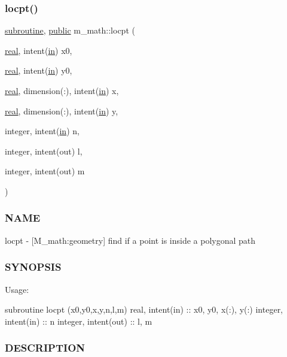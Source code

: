 \subsubsection{\texorpdfstring{locpt()}{locpt()}}
{\footnotesize\ttfamily \hyperlink{M__stopwatch_83_8txt_acfbcff50169d691ff02d4a123ed70482}{subroutine}, \hyperlink{M__stopwatch_83_8txt_a2f74811300c361e53b430611a7d1769f}{public} m\+\_\+math\+::locpt (\begin{DoxyParamCaption}\item[{\hyperlink{read__watch_83_8txt_abdb62bde002f38ef75f810d3a905a823}{real}, intent(\hyperlink{M__journal_83_8txt_afce72651d1eed785a2132bee863b2f38}{in})}]{x0,  }\item[{\hyperlink{read__watch_83_8txt_abdb62bde002f38ef75f810d3a905a823}{real}, intent(\hyperlink{M__journal_83_8txt_afce72651d1eed785a2132bee863b2f38}{in})}]{y0,  }\item[{\hyperlink{read__watch_83_8txt_abdb62bde002f38ef75f810d3a905a823}{real}, dimension(\+:), intent(\hyperlink{M__journal_83_8txt_afce72651d1eed785a2132bee863b2f38}{in})}]{x,  }\item[{\hyperlink{read__watch_83_8txt_abdb62bde002f38ef75f810d3a905a823}{real}, dimension(\+:), intent(\hyperlink{M__journal_83_8txt_afce72651d1eed785a2132bee863b2f38}{in})}]{y,  }\item[{integer, intent(\hyperlink{M__journal_83_8txt_afce72651d1eed785a2132bee863b2f38}{in})}]{n,  }\item[{integer, intent(out)}]{l,  }\item[{integer, intent(out)}]{m }\end{DoxyParamCaption})}



\subsubsection*{N\+A\+ME}

locpt -\/ \mbox{[}M\+\_\+math\+:geometry\mbox{]} find if a point is inside a polygonal path \subsubsection*{S\+Y\+N\+O\+P\+S\+IS}

Usage\+:

subroutine locpt (x0,y0,x,y,n,l,m) real, intent(in) \+:\+: x0, y0, x(\+:), y(\+:) integer, intent(in) \+:\+: n integer, intent(out) \+:\+: l, m

\subsubsection*{D\+E\+S\+C\+R\+I\+P\+T\+I\+ON}

